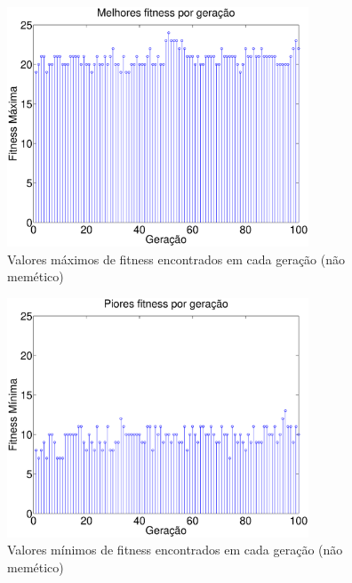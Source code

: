 \documentclass{report}
\begin{document}
\begin{figure}[H]
	\centering
	\includegraphics[width = 0.8\textwidth]{Q02_maximos_fitness_100_ger_nao_memetico.eps}
	\caption{Valores máximos de fitness encontrados em cada geração (não memético)}
	\label{Q02_maximos_fitness_100_ger_nao_memetico}
\end{figure}   

\begin{figure}[H]
	\centering
	\includegraphics[width = 0.8\textwidth]{Q02_minimos_fitness_100_ger_nao_memetico.eps}
	\caption{Valores mínimos de fitness encontrados em cada geração (não memético)}
	\label{Q02_minimos_fitness_100_ger_nao_memetico}
\end{figure}   
\end{document}
